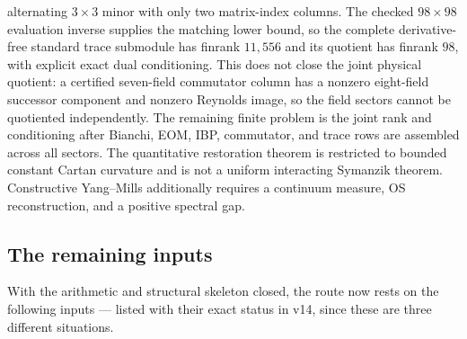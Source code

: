 \documentclass[11pt]{article}
\theoremstyle{definition}
\begin{document}
\begin{itemize}
    alternating $3\times3$ minor with only two matrix-index columns.  The
    checked $98\times98$ evaluation inverse supplies the matching lower
    bound, so the complete derivative-free standard trace submodule has
    finrank $11{,}556$ and its quotient has finrank $98$, with explicit exact
    dual conditioning.  This does not close the joint physical quotient: a
    certified seven-field commutator column has a nonzero eight-field
    successor component and nonzero Reynolds image, so the field sectors
    cannot be quotiented independently.  The remaining finite problem is the
    joint rank and conditioning after Bianchi, EOM, IBP, commutator, and trace
    rows are assembled across all sectors.  The
    quantitative restoration theorem is restricted to bounded constant
    Cartan curvature and is not a uniform interacting Symanzik theorem.
    Constructive Yang--Mills additionally requires a continuum measure, OS
    reconstruction, and a positive spectral gap.
\end{itemize}

\subsection*{The remaining inputs}

With the arithmetic and structural skeleton closed, the route now rests on the
following inputs --- listed with their exact status in v14, since these are
three different situations.
\end{document}
